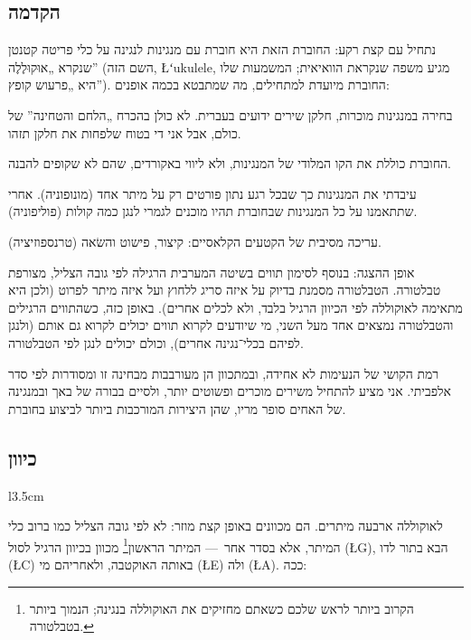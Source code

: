 \subsection*{הקדמה}

נתחיל עם קצת רקע: החוברת הזאת היא חוברת עם מנגינות לנגינה על כלי פריטה קטנטן שנקרא „אוּקוּלֶלֶה” (השם הזה, \L{{ʻ}ukulele}, מגיע משפה שנקראת הוואיאית; המשמעות שלו היא „פרעוש קופץ”). החוברת מיועדת למתחילים, מה שמתבטא בכמה אופנים:
\begin{compactitem}
	\item בחירה במנגינות מוכרות, חלקן שירים ידועים בעברית. לא כולן בהכרח „הלחם והטחינה” של כולם, אבל אני די בטוח שלפחות את חלקן תזהו.
	\item החוברת כוללת את הקו המלודי של המנגינות, ולא ליווי באקורדים, שהם לא שקופים להבנה.
	\item עיבדתי את המנגינות כך שבכל רגע נתון פורטים רק על מיתר אחד (מונופוניה). אחרי שתתאמנו על כל המנגינות שבחוברת תהיו מוכנים לגמרי לנגן כמה קולות (פוליפוניה).
	\item עריכה מסיבית של הקטעים הקלאסיים: קיצור, פישוט והשׂאה (טרנספוזיציה).
	\item אופן ההצגה: בנוסף לסימון תווים בשיטה המערבית הרגילה לפי גובה הצליל, מצורפת טבלטורה. הטבלטורה מסמנת בדיוק על איזה סריג ללחוץ ועל איזה מיתר לפרוט (ולכן היא מתאימה לאוקוללה לפי הכיוון הרגיל בלבד, ולא לכלים אחרים). באופן כזה, כשהתווים הרגילים והטבלטורה נמצאים אחד מעל השני, מי שיודעים לקרוא תווים יכולים לקרוא גם אותם (ולנגן לפיהם בכלי־נגינה אחרים), וכולם יכולים לנגן לפי הטבלטורה.
\end{compactitem}
רמת הקושי של הנעימות לא אחידה, ובמתכוון הן מעורבבות מבחינה זו ומסודרות לפי סדר אלפביתי. אני מציע להתחיל משירים מוכרים ופשוטים יותר, ולסיים בבורה של באך ובמנגינה של האחים סופר מריו, שהן היצירות המורכבות ביותר לביצוע בחוברת.



\subsection*{כיוון}

\begin{wrapfigure}[5]{l}{3.5cm}\vspace{-2\baselineskip}
\end{wrapfigure}
לאוקוללה ארבעה מיתרים. הם מכוונים באופן קצת מוזר: לא לפי גובה הצליל כמו ברוב כלי המיתר, אלא בסדר אחר~— המיתר הראשון\footnote{הקרוב ביותר לראש שלכם כשאתם מחזיקים את האוקוללה בנגינה; הנמוך ביותר בטבלטורה.} מכוון בכיוון הרגיל לסול (\L{G}), הבא בתור לדו (\L{C}) באותה האוקטבה, ולאחריהם מי (\L{E}) ולה (\L{A}). ככה:

